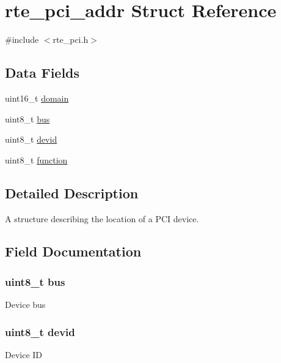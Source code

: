\hypertarget{structrte__pci__addr}{}\section{rte\+\_\+pci\+\_\+addr Struct Reference}
\label{structrte__pci__addr}


{\ttfamily \#include $<$rte\+\_\+pci.\+h$>$}

\subsection*{Data Fields}
\begin{DoxyCompactItemize}
\item 
uint16\+\_\+t \hyperlink{structrte__pci__addr_a71f5a95cafc58280f7afe1de6dfd98a2}{domain}
\item 
uint8\+\_\+t \hyperlink{structrte__pci__addr_a5262d4a80e6a0b6dce6fd57d4656786d}{bus}
\item 
uint8\+\_\+t \hyperlink{structrte__pci__addr_aa799dbc408c1f960384b4ab8ed12e6cc}{devid}
\item 
uint8\+\_\+t \hyperlink{structrte__pci__addr_a974c3822230d6402909c0b90969ae8eb}{function}
\end{DoxyCompactItemize}


\subsection{Detailed Description}
A structure describing the location of a P\+C\+I device. 

\subsection{Field Documentation}
\hypertarget{structrte__pci__addr_a5262d4a80e6a0b6dce6fd57d4656786d}{}
\subsubsection[{bus}]{\setlength{\rightskip}{0pt plus 5cm}uint8\+\_\+t bus}\label{structrte__pci__addr_a5262d4a80e6a0b6dce6fd57d4656786d}
Device bus \hypertarget{structrte__pci__addr_aa799dbc408c1f960384b4ab8ed12e6cc}{}
\subsubsection[{devid}]{\setlength{\rightskip}{0pt plus 5cm}uint8\+\_\+t devid}\label{structrte__pci__addr_aa799dbc408c1f960384b4ab8ed12e6cc}
Device I\+D \hypertarget{structrte__pci__addr_a71f5a95cafc58280f7afe1de6dfd98a2}{}
